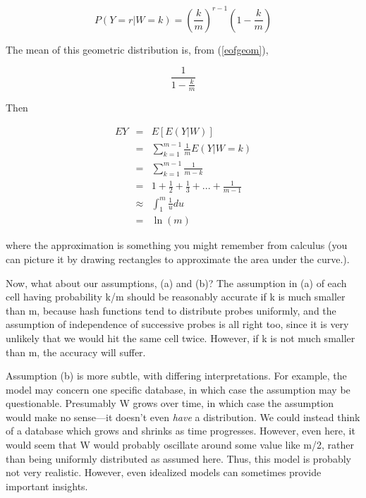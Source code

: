 \begin{equation}
P(Y = r | W = k) = {(\frac{k}{m})}^{r-1} (1-\frac{k}{m})
\end{equation}

The mean of this geometric distribution is, from (\ref{eofgeom}),

\begin{equation} 
\frac{1}{1-\frac{k}{m}}
\end{equation}

Then 

\begin{eqnarray}
EY & = & E[E(Y|W)]\\
 & = & \sum ^{m-1}_{k=1}\frac{1}{m}E(Y|W=k)\\
 & = & \sum ^{m-1}_{k=1}\frac{1}{m-k}\\
 & = & 1+\frac{1}{2}+\frac{1}{3}+...+\frac{1}{m-1}\\
 & \approx  & \int_1^m \frac{1}{u} du \\
 & = & \ln(m)
\end{eqnarray}

where the approximation is something you might remember from calculus
(you can picture it by drawing rectangles to approximate the area under
the curve.).

Now, what about our assumptions, (a) and (b)?  The assumption in (a) of
each cell having probability k/m should be reasonably accurate if k is
much smaller than m, because hash functions tend to distribute probes
uniformly, and the assumption of independence of successive probes is
all right too, since it is very unlikely that we would hit the same cell
twice.  However, if k is not much smaller than m, the accuracy will
suffer.

Assumption (b) is more subtle, with differing interpretations.  For
example, the model may concern one specific database, in which case the
assumption may be questionable.  Presumably W grows over time, in which
case the assumption would make no sense---it doesn't even {\it have} a
distribution.  We could instead think of a database which grows and
shrinks as time progresses.  However, even here, it would seem that W
would probably oscillate around some value like m/2, rather than being
uniformly distributed as assumed here.  Thus, this model is probably not
very realistic.  However, even idealized models can sometimes provide
important insights.

